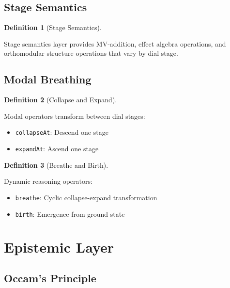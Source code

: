 \documentclass{amsart}
\theoremstyle{definition}
\newtheorem{definition}{Definition}[section]
\theoremstyle{remark}
\begin{document}
\subsection{Stage Semantics}
\label{sec:stage-semantics}

\begin{definition}[Stage Semantics]
\label{def:stage-semantics}
\uses{}

Stage semantics layer provides MV-addition, effect algebra operations, and orthomodular structure operations that vary by dial stage.
\end{definition}

\subsection{Modal Breathing}
\label{sec:modal-breathing}

\begin{definition}[Collapse and Expand]
\label{def:collapse-expand}

Modal operators transform between dial stages:
\begin{itemize}
\item \texttt{collapseAt}: Descend one stage
\item \texttt{expandAt}: Ascend one stage
\end{itemize}
\end{definition}

\begin{definition}[Breathe and Birth]
\label{def:breathe-birth}

Dynamic reasoning operators:
\begin{itemize}
\item \texttt{breathe}: Cyclic collapse-expand transformation
\item \texttt{birth}: Emergence from ground state
\end{itemize}
\end{definition}

\section{Epistemic Layer}

\subsection{Occam's Principle}
\label{sec:occam}
\end{document}
